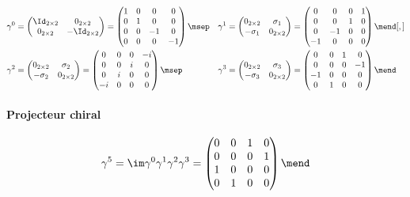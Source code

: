 \begin{align}
\gamma^{0} &= \begin{pmatrix}\Id_{2\times2} & 0_{2\times2}\\0_{2\times2} & -\Id_{2\times2}\end{pmatrix} = \begin{pmatrix}1&0&0&0\\0&1&0&0\\0&0&-1&0\\0&0&0&-1\end{pmatrix}
\msep&
\gamma^{1} &= \begin{pmatrix}0_{2\times2} & \sigma_1\\-\sigma_1 & 0_{2\times2}\end{pmatrix} = \begin{pmatrix}0&0&0&1\\0&0&1&0\\0&-1&0&0\\-1&0&0&0\end{pmatrix} \mend[,]
\nonumber\\
\gamma^{2} &= \begin{pmatrix}0_{2\times2} & \sigma_2\\-\sigma_2 & 0_{2\times2}\end{pmatrix} = \begin{pmatrix}0&0&0&-i\\0&0&i&0\\0&i&0&0\\-i&0&0&0\end{pmatrix}
\msep&
\gamma^{3} &= \begin{pmatrix}0_{2\times2} & \sigma_3\\-\sigma_3 & 0_{2\times2}\end{pmatrix} = \begin{pmatrix}0&0&1&0\\0&0&0&-1\\-1&0&0&0\\0&1&0&0\end{pmatrix} \mend
\end{align}

\paragraph{Projecteur chiral}

\begin{equation}
\gamma^5 = \im\gamma^0\gamma^1\gamma^2\gamma^3 = \begin{pmatrix}0&0&1&0\\0&0&0&1\\1&0&0&0\\0&1&0&0\end{pmatrix}\mend
\end{equation}

